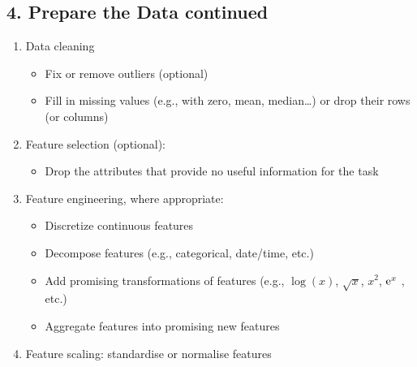 \begin{slide}
\section[-2]{4. Prepare the Data continued}

\begin{PauseHighLight}\squeeze
  \begin{enumerate}
  \item Data cleaning
    \begin{itemize}
    \item Fix or remove outliers (optional)
    \item Fill in missing values (e.g., with zero, mean, median…) or
      drop their rows (or columns)\pause
    \end{itemize}
  \item Feature selection (optional):
    \begin{itemize}
    \item Drop the attributes that provide no useful information for
      the task\pause
    \end{itemize}
  \item Feature engineering, where appropriate:
    \begin{itemize}
    \item Discretize continuous features
    \item Decompose features (e.g., categorical, date/time, etc.)
    \item Add promising transformations of features (e.g., $\log(x)$,
      $\sqrt{x}$, $x^2$, ${\rm e}^{x}$ , etc.)\pause
    \item Aggregate features into promising new features\pause
    \end{itemize}
  \item Feature scaling: standardise or normalise features\pause
  \end{enumerate}
\end{PauseHighLight}


\end{slide}



